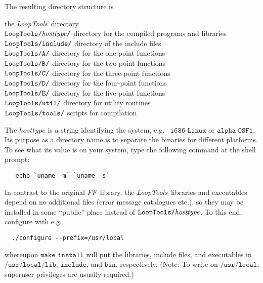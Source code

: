 \documentclass[twoside,12pt]{report}
\def\greyed#1{\special{ps: .7 setgray}#1\special{ps: 0 setgray}}
\def\FF{\textit{FF}}
\def\LT{\textit{LoopTools}}
\def\eg{e.g.\ }
\def\Code#1{\ensuremath{\texttt{#1}}}
\def\Var#1{\ensuremath{\mathit{#1}}}
\begin{document}
\pagebreak

The resulting directory structure is
\begin{tabbing}
\rlap{\Code{LoopTools/}}\hspace{.3\linewidth} \=
	the \LT\ directory \\
\Code{\greyed{LoopTools/}\Var{hosttype}/} \>
	directory for the compiled programs and libraries \\
\Code{\greyed{LoopTools/}include/} \>
	directory of the include files \\
\Code{\greyed{LoopTools/}A/} \>
	directory for the one-point functions \\
\Code{\greyed{LoopTools/}B/} \>
	directory for the two-point functions \\
\Code{\greyed{LoopTools/}C/} \>
	directory for the three-point functions \\
\Code{\greyed{LoopTools/}D/} \>
	directory for the four-point functions \\
\Code{\greyed{LoopTools/}E/} \>
	directory for the five-point functions \\
\Code{\greyed{LoopTools/}util/} \>
	directory for utility routines \\
\Code{\greyed{LoopTools/}tools/} \>
	scripts for compilation
\end{tabbing}

%
The \Var{hosttype} is a string identifying the system, \eg 
\Code{i686-Linux} or \Code{alpha-OSF1}.  Its purpose as a directory 
name is to separate the binaries for different platforms.  To see what 
its value is on your system, type the following command at the shell 
prompt:
\begin{verbatim}
   echo `uname -m`-`uname -s`
\end{verbatim}

In contrast to the original \FF\ library, the \LT\ libraries and
executables depend on no additional files (error message catalogues etc.),
so they may be installed in some ``public'' place instead of
\Code{LoopTools/\Var{hosttype}}.  To this end, configure with \eg
\begin{verbatim}
  ./configure --prefix=/usr/local
\end{verbatim}
whereupon \Code{make install} will put the libraries, include files,
and executables in \Code{/usr/local/lib}, \Code{include}, and
\Code{bin}, respectively.  (Note: To write on \Code{/usr/local}, 
superuser privileges are usually required.)


\clearpage
\end{document}
